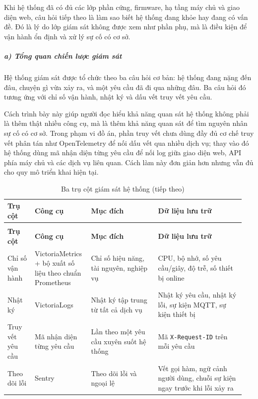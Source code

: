 \documentclass[a4paper]{extarticle}
\newcommand{\thesissettableid}[2]{%
  \renewcommand{\thetable}{#1}%
  \renewcommand{\theHtable}{#2}%
}
\begin{document}
Khi hệ thống đã có đủ các lớp phần cứng, firmware, hạ tầng máy chủ và
giao diện web,
câu hỏi tiếp theo là làm sao biết hệ thống đang khỏe hay đang có vấn đề.
Đó là lý do lớp giám sát không được xem như phần phụ, mà là điều kiện để
vận hành ổn định và xử lý sự cố có cơ sở.

\subparagraph{a) Tổng quan chiến lược giám
sát}\label{a-tux1ed5ng-quan-chiux1ebfn-lux1b0ux1ee3c-giuxe1m-suxe1t}

Hệ thống giám sát được tổ chức theo ba câu hỏi cơ bản: hệ thống đang
nặng đến đâu, chuyện gì vừa xảy ra, và một yêu cầu đã đi qua những đâu.
Ba câu hỏi đó tương ứng với chỉ số vận hành, nhật ký và dấu vết truy vết yêu cầu.

Cách trình bày này giúp người đọc hiểu khả năng quan sát hệ thống không
phải là thêm thật nhiều công cụ, mà là thêm khả năng quan sát để tìm
nguyên nhân sự cố có cơ sở. Trong phạm vi đồ án, phần truy vết chưa dùng
đầy đủ cơ chế truy vết phân tán như OpenTelemetry để nối dấu vết qua
nhiều dịch vụ; thay vào đó hệ thống dùng mã nhận diện từng yêu cầu để
nối log giữa giao diện web, API phía máy chủ và các dịch vụ liên quan.
Cách làm này đơn giản hơn nhưng vẫn đủ cho quy mô triển khai hiện tại.


{\thesissettableid{4.10}{tab-ch4-ba-tru-cot-giam-sat-he-thong}
\def\LTcaptype{table}
\begin{longtable}{|L{0.115\linewidth}|L{0.209\linewidth}|L{0.276\linewidth}|L{0.354\linewidth}|}
\caption{Ba trụ cột giám sát hệ thống}\label{tab:ch4-ba-tru-cot-giam-sat-he-thong}\\
\hline \textbf{Trụ cột} & \textbf{Công cụ} & \textbf{Mục đích} & \textbf{Dữ liệu lưu trữ} \\
\hline
\endfirsthead
\caption[]{Ba trụ cột giám sát hệ thống (tiếp theo)}\\
\hline \textbf{Trụ cột} & \textbf{Công cụ} & \textbf{Mục đích} & \textbf{Dữ liệu lưu trữ} \\
\hline
\endhead
\hline
\endfoot
\endlastfoot
Chỉ số vận hành & VictoriaMetrics + bộ xuất số liệu theo chuẩn Prometheus & Chỉ số
hiệu năng, tài nguyên, nghiệp vụ & CPU, bộ nhớ, số yêu cầu/giây, độ trễ,
số thiết bị online \\\hline
Nhật ký & VictoriaLogs & Nhật ký tập trung từ tất cả dịch vụ & Nhật ký
yêu cầu, nhật ký lỗi, sự kiện MQTT, sự kiện thiết bị \\\hline
Truy vết yêu cầu & Mã nhận diện từng yêu cầu & Lần theo một yêu cầu xuyên suốt hệ thống &
Mã \texttt{X-Request-ID} trên mỗi yêu cầu \\\hline
Theo dõi lỗi & Sentry & Theo dõi lỗi và ngoại lệ & Vết gọi hàm, ngữ cảnh người dùng,
chuỗi sự kiện ngay trước khi lỗi xảy ra \\\hline
\end{longtable}
}
\end{document}
